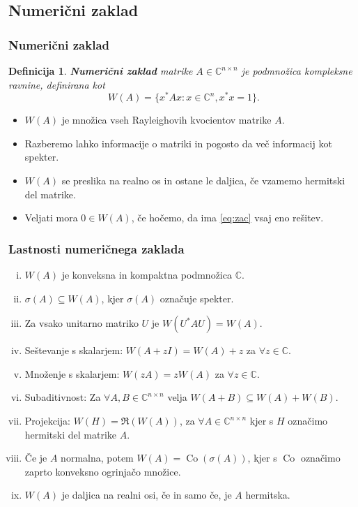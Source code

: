 \documentclass{beamer}
\newcommand{\Co}{\operatorname{Co}} %
\newcommand{\C}{\mathbb C}
\newtheorem{definicija}[izrek]{Definicija}
\begin{document}
\subsection{Numerični zaklad}
\begin{frame}
\frametitle{Numerični zaklad}
\begin{definicija}
\textbf{Numerični zaklad} matrike $A \in \C^{n\times n}$ je podmnožica kompleksne ravnine, definirana kot
$$W(A)=\{x^\ast Ax: x \in \C^n, x^\ast x=1\}.$$
\end{definicija}\pause
\begin{itemize}
\item $W(A)$  je množica vseh Rayleighovih kvocientov matrike $A$.
\item Razberemo lahko informacije o matriki in pogosto da več informacij kot spekter.
\item $W(A)$ se preslika na realno os in ostane le daljica, če vzamemo hermitski del matrike.
\item Veljati mora $0 \in W(A)$, če hočemo, da ima \eqref{eq:zac} vsaj eno rešitev.
\end{itemize}


\end{frame}

\begin{frame}
\frametitle{Lastnosti numeričnega zaklada}
\begin{enumerate}[(i)]
\item $W(A)$ je konveksna in kompaktna podmnožica $\C$.
\item $\sigma(A)\subseteq W(A)$, kjer $\sigma(A)$ označuje spekter.
\item Za vsako unitarno matriko $U$ je $W(U^\ast AU)=W(A).$

\item Seštevanje s skalarjem: $W(A+zI)=W(A)+z$ za $\forall z \in \C$.

\item Množenje s skalarjem: $W(zA)=zW(A)$ za $\forall z \in \C$.

\item Subaditivnost: Za $\forall A, B \in \C^{n\times n}$ velja $W(A+B) \subseteq W(A) +W(B).$

\item Projekcija: $W(H)= \Re( W(A))$, za $\forall A\in \C^{n\times n}$ kjer s $H$ označimo hermitski del matrike $A$.
\item Če je $A$ normalna, potem $W(A)=\Co(\sigma(A))$, kjer s $\Co$ označimo zaprto konveksno ogrinjačo množice.

\item $W(A)$ je daljica na realni osi, če in samo če, je $A$ hermitska.

\end{enumerate}
\end{frame}
\end{document}
